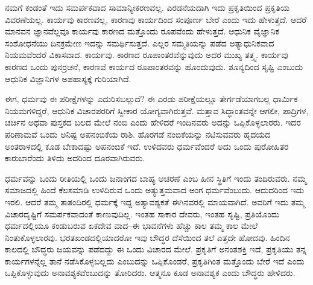 \vskip 5pt

ನಮಗೆ ಕಂಡಂತೆ ಇದು ಸಮರ್ಪಕವಾದ ಸಾಮಾನ್ಯೀಕರಣವಲ್ಲ. ಎರಡನೆಯದಾಗಿ ಇದು ಪ್ರಕೃತಿಯಿಂದ ಪ್ರಕೃತಿಯ ವಿವರಣೆಯಲ್ಲ. ಕಾರ್ಯವು ಕಾರಣವಲ್ಲ, ಕಾರಣವು ಕಾರ್ಯದಿಂದ ಸಂಪೂರ್ಣ ಬೇರೆ ಎಂದು ಇದು ಹೇಳುತ್ತದೆ. ಆದರೆ ಮಾನವನ ಜ್ಞಾನವೆಲ್ಲವೂ ಕಾರ್ಯವು ಕಾರಣದ ಮತ್ತೊಂದು ರೂಪವೆಂದು ಹೇಳುತ್ತದೆ. ಆಧುನಿಕ ವೈಜ್ಞಾನಿಕ ಸಂಶೋಧನೆಯು ದಿನಕ್ರಮೇಣ ಇದನ್ನು ಸಮರ್ಥಿಸುತ್ತದೆ. ಎಲ್ಲರ ಸಮ್ಮತಿಯನ್ನು ಪಡೆದ ಅತ್ಯಾಧುನಿಕವಾದ ನಿಯಮವೆಂದರೆ ವಿಕಾಸವಾದ. ಕಾರ್ಯವು. ಕಾರಣದ ರೂಪಾಂತರವೆನ್ನುವುದು ಅದರ ಮುಖ್ಯ ತತ್ತ್ವ. ಕಾರ್ಯವು ಕಾರಣದ ಒಂದು ಪುನರ್ರಚನೆ, ಕಾರಣವೆ ಕಾರ್ಯದ ರೂಪಾಂತರವನ್ನು ಹೊಂದುವುದು. ಶೂನ್ಯದಿಂದ ಸೃಷ್ಟಿ ಎಂಬುದು ಆಧುನಿಕ ವಿಜ್ಞಾನಿಗಳ ಅಪಹಾಸ್ಯಕ್ಕೆ ಗುರಿಯಾಗಿದೆ. 



ಈಗ, ಧರ್ಮವು ಈ ಪರೀಕ್ಷೆಗಳನ್ನು ಎದುರಿಸಬಲ್ಲುದೆ? ಈ ಎರಡು ಪರೀಕ್ಷೆಯಲ್ಲೂ ತೇರ್ಗಡೆಯಾಗಬಲ್ಲ ಧಾರ್ಮಿಕ ನಿಯಮಗಳಿದ್ದರೆ, ಆಧುನಿಕ ವಿಚಾರಪರರಿಗೆ ಸ್ವೀಕಾರ ಯೋಗ್ಯವಾಗಿರುತ್ತವೆ. ಮತ್ತಾವ ಸಿದ್ಧಾಂತವನ್ನೇ ಆಗಲೀ, ಪಾದ್ರಿಗಳ, ಚರ್ಚಿನ ಅಥವಾ ಪುಸ್ತಕದ ಬಲದ ಮೇಲೆ ನಂಬಿ ಎಂದು ಹೇಳಿದರೆ ಇಂದಿನವರು ಅದನ್ನು ಒಪ್ಪಿಕೊಳ್ಳಲಾರರು. ಇದರ ಪರಿಣಾಮವೆ ಒಂದು ಅನಿಷ್ಟ ಅಪನಂಬಿಕೆಯ ರಾಶಿ. ಹೊರಗಡೆ ನಂಬಿಕೆಯನ್ನು ನಟಿಸುವವರು ಹೃದಯದ ಅಂತರಾಳದಲ್ಲಿ ಕೂಡ ಬೇಕಾದಷ್ಟು ಅಪನಂಬಿಕೆ ಇದೆ. ಉಳಿದವರು ಧರ್ಮವೆಂದರೆ ಅದು ಒಂದು ಪುರೋಹಿತರ ಕಾರುಬಾರೆಂದು ತಿಳಿದು ಅದರಿಂದ ದೂರವಾಗಿರುವರು. 

\vskip 0.3cm

ಧರ್ಮವನ್ನು ಒಂದು ರೀತಿಯಲ್ಲಿ ಒಂದು ಜನಾಂಗದ ಬಾಹ್ಯ ಆಚರಣೆ ಎಂಬ ಹೀನ ಸ್ಥಿತಿಗೆ ಇಂದು ತಂದಿರುವರು. ನಮ್ಮ ಸಮಾಜದಲ್ಲಿ ಹಿಂದೆ ಕೆಲಸಮಾಡಿ ಉಳಿದಿರುವ ಒಂದು ಅತ್ಯುತ್ತಮವಾದ ಅಂಗ ಧರ್ಮವೆಂಬುದು. ಆದುದರಿಂದ ಇದು ಇರಲಿ. ಆದರೆ ತಮ್ಮ ತಾತಂದಿರಲ್ಲಿ ಧರ್ಮಕ್ಕೆ ಇದ್ದ ಅತ್ಯಾವಶ್ಯಕತೆ ಈಗಿನವರಲ್ಲಿ ಮಾಯವಾಗಿದೆ. ಅವರಿಗೆ ಇದು ತಮ್ಮ ವಿಚಾರದೃಷ್ಟಿಗೆ ಸಮರ್ಪಕವಾದಂತೆ ಕಾಣುವುದಿಲ್ಲ. ಇಂತಹ ಸಾಕಾರ ದೇವರು, ಇಂತಹ ಸೃಷ್ಟಿ, ಪ್ರತಿಯೊಂದು ಧರ್ಮದಲ್ಲಿಯೂ ಕಂಡುಬರುವ ಏಕದೇವ ವಾದ–ಈ ಭಾವನೆಗಳು ಹೆಚ್ಚು ಕಾಲ ತಮ್ಮ ಕಾಲ ಮೇಲೆ ನಿಂತುಕೊಳ್ಳಲಾರವು. ಭರತಖಂಡದಲ್ಲಿಯಾದರೋ ಇವು ಬೌದ್ಧರ ದೆಸೆಯಿಂದ ತಲೆ ಎತ್ತದೇ ಹೋದವು. ಹಿಂದಿನ ಕಾಲದಲ್ಲಿ ಬೌದ್ಧರು ಜಯವನ್ನು ಪಡೆದದ್ದು ಈ ಒಂದು ವಿಚಾರದ ಮೇಲೆ. ಪ್ರಕೃತಿಗೆ ಅನಂತಶಕ್ತಿ ಇದೆ, ಪ್ರಕೃತಿಯು ತನ್ನ ಕಾರ್ಯಗಳನ್ನೆಲ್ಲ ತಾನೆ ನಡೆಸಿಕೊಳ್ಳಬಲ್ಲದು ಎಂಬುದನ್ನು ಒಪ್ಪಿಕೊಂಡರೆ, ಪ್ರಕೃತಿಗಿಂತ ಮತ್ತೊಂದು ಬೇರೆ ಇದೆ ಎಂದು ಒಪ್ಪಿಕೊಳ್ಳುವುದು ಅನಾವಶ್ಯಕವೆಂಬುದನ್ನು ತೋರಿದರು. ಆತ್ಮನೂ ಕೂಡ ಅನಾವಶ್ಯಕ ಎಂದು ಬೌದ್ಧರು ಹೇಳಿದರು. 

\vskip 0.2cm

